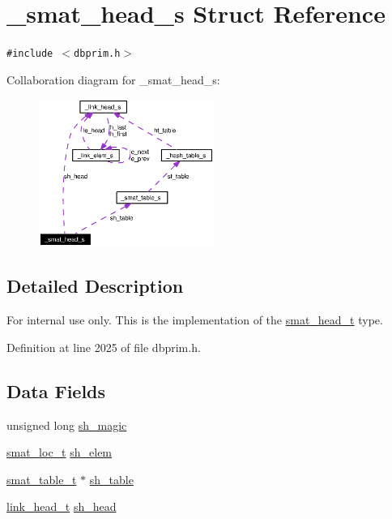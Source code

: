 \hypertarget{struct__smat__head__s}{
\section{\_\-smat\_\-head\_\-s Struct Reference}
\label{struct__smat__head__s}
}
{\tt \#include $<$dbprim.h$>$}

Collaboration diagram for \_\-smat\_\-head\_\-s:\begin{figure}[H]
\begin{center}
\leavevmode
\includegraphics[width=162pt]{struct__smat__head__s__coll__graph}
\end{center}
\end{figure}


\subsection{Detailed Description}
\begin{Desc}
\item[For internal use only.]
This is the implementation of the \hyperlink{group__dbprim__smat_ga1}{smat\_\-head\_\-t} type.\end{Desc}




Definition at line 2025 of file dbprim.h.\subsection*{Data Fields}
\begin{CompactItemize}
\item 
unsigned long \hyperlink{struct__smat__head__s_o0}{sh\_\-magic}
\item 
\hyperlink{group__dbprim__smat_ga6}{smat\_\-loc\_\-t} \hyperlink{struct__smat__head__s_o1}{sh\_\-elem}
\item 
\hyperlink{struct__smat__table__s}{smat\_\-table\_\-t} $\ast$ \hyperlink{struct__smat__head__s_o2}{sh\_\-table}
\item 
\hyperlink{struct__link__head__s}{link\_\-head\_\-t} \hyperlink{struct__smat__head__s_o3}{sh\_\-head}
\end{CompactItemize}


